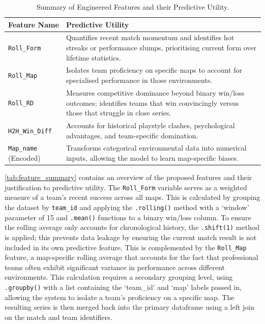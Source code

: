 \begin{table}[H]
    \centering
    \small
    \begin{tabularx}{\linewidth}{@{} l >{\raggedright\arraybackslash}X @{}}
        \toprule
        \textbf{Feature Name} & \textbf{Predictive Utility} \\ 
        \midrule
        
        \texttt{Roll\_Form} & 
        Quantifies recent match momentum and identifies hot streaks or performance slumps, prioritising current form over lifetime statistics. \\
        \addlinespace
        
        \midrule
        \texttt{Roll\_Map} & 
        Isolates team proficiency on specific maps to account for specialised performance in those environments. \\
        \addlinespace
        
        \midrule
        \texttt{Roll\_RD} & 
        Measures competitive dominance beyond binary win/loss outcomes; identifies teams that win convincingly versus those that struggle in close series. \\
        \addlinespace
        
        \midrule
        \texttt{H2H\_Win\_Diff} & 
        Accounts for historical playstyle clashes, psychological advantages, and team-specific domination. \\
        \addlinespace
        
        \midrule
        \texttt{Map\_name} (Encoded) & 
        Transforms categorical environmental data into numerical inputs, allowing the model to learn map-specific biases. \\
        \bottomrule
    \end{tabularx}
    \caption{Summary of Engineered Features and their Predictive Utility.}
    \label{tab:feature_summary}
\end{table}

\autoref{tab:feature_summary} contains an overview of the proposed features and their justification to predictive utility. The \texttt{Roll\_Form} variable serves as a weighted measure of a team's recent success across all maps. This is calculated by grouping the dataset by \texttt{team\_id} and applying the \texttt{.rollin\-g()} method with a `window' parameter of 15 and \texttt{.mean()} functions to a binary win/loss column. To ensure the rolling average only accounts for chronological history, the \texttt{.shift(1)} method is applied; this prevents data leakage by ensuring the current match result is not included in its own predictive feature. This is complemented by the \texttt{Roll\_Map} feature, a map-specific rolling average that accounts for the fact that professional teams often exhibit significant variance in performance across different environments. This calculation requires a secondary grouping level, using \texttt{.groupby()} with a list containing the `team\_id' and `map' labels passed in, allowing the system to isolate a team's proficiency on a specific map. The resulting series is then merged back into the primary dataframe using a left join on the match and team identifiers.

